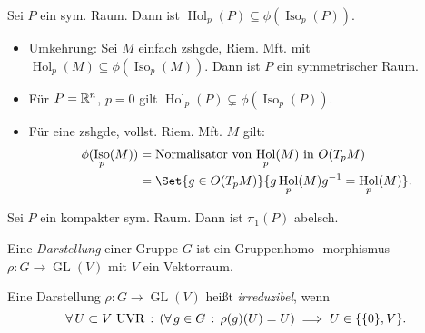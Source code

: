 \documentclass{cheat-sheet}
\DeclareMathOperator{\GL}{GL} %
\DeclareMathOperator{\Iso}{Iso} %
\DeclareMathOperator{\Hol}{Hol} %
\begin{document}
\iffalse
\begin{defn}
  Sei $M$ eine Riem. Mft, $p \in M$. Dann heißt
  \[
    \Hol_p(M) \coloneqq \Set{ P_c }{ c : \I \to M \text{ stückw. reg. Kurve, } c(0) \!=\! c(1) \!=\! p }
  \]
  \emph{Holonomiegruppe} von $p$ ($\Hol_p(M) \subseteq O(T_p M)$).
\end{defn}
\fi

\begin{satz}
  Sei $P$ ein sym. Raum. Dann ist $\Hol_p(P) \subseteq \phi(\Iso_p(P))$.
\end{satz}

\begin{bem}
  \begin{itemize}
    \item Umkehrung: Sei $M$ einfach zshgde, Riem. Mft. mit $\Hol_p(M) \subseteq \phi(\Iso_p(M))$. Dann ist $P$ ein symmetrischer Raum. %
    \item Für $P = \mathbb{R}^n$, $p = 0$ gilt $\Hol_p(P) \subsetneq \phi(\Iso_p(P))$.
    \item Für eine zshgde, vollst. Riem. Mft. $M$ gilt:
    \begin{align*}
      \phi(\Iso_p(M)) & = \text{Normalisator von $\Hol_p(M)$ in $O(T_p M)$} \\
      & = \Set{ g \in O(T_p M) }{ g \Hol_p(M) g^{-1} = \Hol_p(M) }.
    \end{align*}
  \end{itemize}
\end{bem}

\begin{satz}
  Sei $P$ ein kompakter sym. Raum. Dann ist $\pi_1(P)$ abelsch.
\end{satz}



\begin{defn}
  Eine \emph{Darstellung} einer Gruppe $G$ ist ein Gruppenhomo- morphismus $\rho : G \to \GL(V)$ mit $V$ ein Vektorraum.
\end{defn}

\begin{defn}
  Eine Darstellung $\rho : G \to \GL(V)$ heißt \emph{irreduzibel}, wenn
  \[ \forall \, {U \subset V \text{ UVR}} \,:\, (\forall \, {g \in G} \,:\, \rho(g)(U) = U) \implies U \in \{ \{ 0 \}, V \}. \]
\end{defn}
\end{document}
